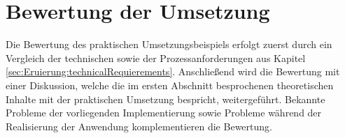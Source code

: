 \section{Bewertung der Umsetzung}
\label{cha:rating}
Die Bewertung des praktischen Umsetzungsbeispiels erfolgt zuerst durch ein Vergleich der technischen sowie der Prozessanforderungen aus Kapitel \ref{sec:Eruierung:technicalRequierements}. Anschließend wird die Bewertung mit einer Diskussion, welche die im ersten Abschnitt besprochenen theoretischen Inhalte mit der praktischen Umsetzung bespricht, weitergeführt. Bekannte Probleme der vorliegenden Implementierung sowie Probleme während der Realisierung der Anwendung komplementieren die Bewertung.
% 
% 

